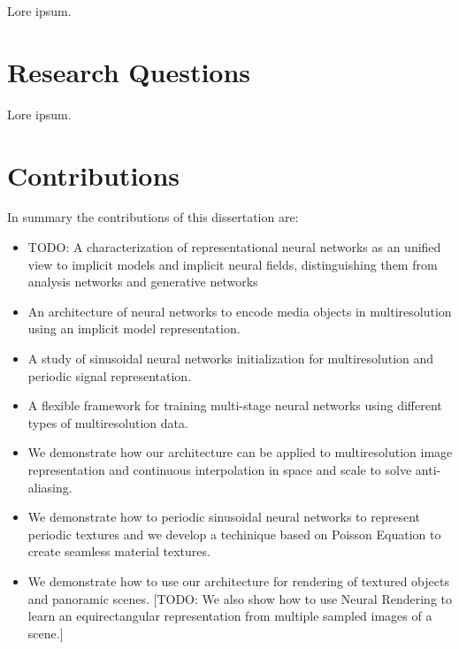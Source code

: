 Lore ipsum.

\section{Research Questions}

Lore ipsum.


\section{Contributions}

In summary the contributions of this dissertation are:

\begin{itemize}
    \item TODO: A characterization of representational neural networks as an unified view to implicit models and implicit neural fields, distinguishing them from analysis networks and generative networks
    \item An architecture of neural networks to encode media objects in multiresolution using an implicit model representation.
    \item A study of sinusoidal neural networks initialization for multiresolution and periodic signal representation.
    \item A flexible framework for training multi-stage neural networks using different types of multiresolution data.
    \item We demonstrate how our architecture can be applied to multiresolution image representation and continuous interpolation in space and scale to solve anti-aliasing.
    \item We demonstrate how to periodic sinusoidal neural networks to represent periodic textures and we develop a techinique based on Poisson Equation to create seamless material textures.
    \item We demonstrate how to use our architecture for rendering of textured objects and panoramic scenes. [TODO: We also show how to use Neural Rendering to learn an equirectangular representation from multiple sampled images of a scene.]
\end{itemize}